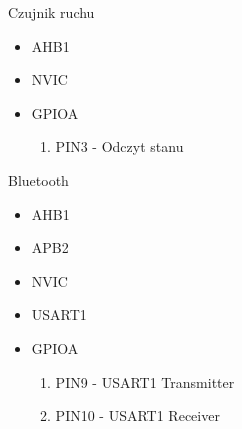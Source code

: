 \documentclass{article}
\begin{document}
Czujnik ruchu
\begin{itemize}
    \item AHB1
    \item NVIC
    \item GPIOA
        \begin{enumerate}
            \item PIN3 - Odczyt stanu
        \end{enumerate}
\end{itemize}

Bluetooth
\begin{itemize}
    \item AHB1
    \item APB2
    \item NVIC
    \item USART1
    \item GPIOA
        \begin{enumerate}
            \item PIN9 - USART1 Transmitter
            \item PIN10 - USART1 Receiver
        \end{enumerate}
\end{itemize}







\end{document}
